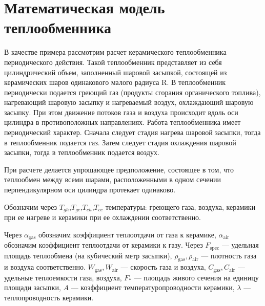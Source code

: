 \documentclass[a4paper,12pt]{article}
\begin{document}
\section{Математическая модель теплообменника}

В качестве примера рассмотрим расчет керамического теплообменника
периодического действия. Такой теплообменник представляет из себя
цилиндрический объем, заполненный шаровой засыпкой, состоящей из
керамических шаров одинакового малого радиуса R. В теплообменник
периодически подается греющий газ (продукты сгорания органического
топлива), нагревающий шаровую засыпку и нагреваемый воздух, охлаждающий
шаровую засыпку. При этом движение потоков газа и воздуха происходит вдоль
оси цилиндра в противоположных направлениях. Работа теплообменника имеет
периодический характер. Сначала следует стадия нагрева шаровой засыпки,
тогда в теплообменник подается газ. Затем следует стадия охлаждения шаровой
засыпки, тогда в теплообменник подается воздух.

При расчете делается упрощающее предположение, состоящее в том, что
теплообмен между всеми шарами, расположенными в одном сечении
перпендикулярном оси цилиндра протекает одинаково.

Обозначим через $T_{gh}$,$T_{gc}$,$T_{ch}$,$T_{cc}$ температуры: греющего
газа, воздуха, керамики при ее нагреве и керамики при ее охлаждении
соответственно.

Через $\alpha_{\text{gas}}$ обозначим коэффициент теплоотдачи от газа к
керамике, $\alpha_{\text{air}}$ обозначим коэффициент теплоотдачи от
керамики к газу. Через $F_{\text{spec}}$  --- удельная площадь теплообмена
(на кубический метр
засыпки), $\rho_{\text{gas}}, \rho_{\text{air}}$ --- плотность газа и воздуха
соответственно. $W_{\text{gas}},W_{\text{air}}$ --- скорость газа и
воздуха, $C_{\text{gas}},C_{\text{air}}$ --- удельные теплоемкости газа,
воздуха, $F_{*}$ --- площадь живого сечения
на единицу площади засыпки, $A$ --- коэффициент температуропроводности керамики,
$\lambda$ --- теплопроводность керамики.
\end{document}
